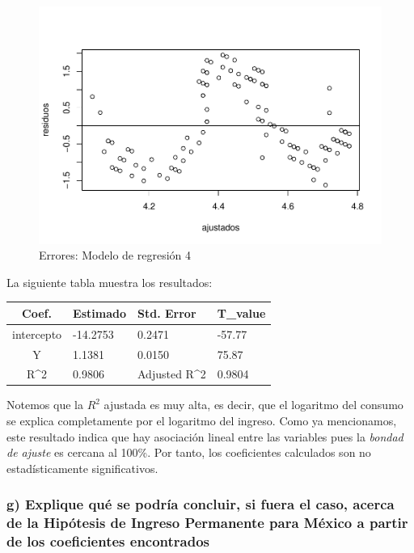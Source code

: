 \documentclass[
]{article}
\begin{document}
\begin{figure}
\centering
\includegraphics{Ejercicio-3_files/figure-latex/unnamed-chunk-18-1.pdf}
\caption{Errores: Modelo de regresión 4}
\end{figure}

La siguiente tabla muestra los resultados:

\begin{longtable}[]{@{}clll@{}}
\toprule
\textbf{Coef.} & \textbf{Estimado} & \textbf{Std. Error} &
\textbf{T\_value} \\
\midrule
\endhead
intercepto & -14.2753 & 0.2471 & -57.77 \\
Y & 1.1381 & 0.0150 & 75.87 \\
R\^{}2 & 0.9806 & Adjusted R\^{}2 & 0.9804 \\
\bottomrule
\end{longtable}

Notemos que la \(R^2\) ajustada es muy alta, es decir, que el logaritmo
del consumo se explica completamente por el logaritmo del ingreso. Como
ya mencionamos, este resultado indica que hay asociación lineal entre
las variables pues la \emph{bondad de ajuste} es cercana al 100\%. Por
tanto, los coeficientes calculados son no estadísticamente
significativos.

\hypertarget{g-explique-quuxe9-se-podruxeda-concluir-si-fuera-el-caso-acerca-de-la-hipuxf3tesis-de-ingreso-permanente-para-muxe9xico-a-partir-de-los-coeficientes-encontrados}{%
\subsubsection{g) Explique qué se podría concluir, si fuera el caso,
acerca de la Hipótesis de Ingreso Permanente para México a partir de los
coeficientes
encontrados}\label{g-explique-quuxe9-se-podruxeda-concluir-si-fuera-el-caso-acerca-de-la-hipuxf3tesis-de-ingreso-permanente-para-muxe9xico-a-partir-de-los-coeficientes-encontrados}}
\end{document}
